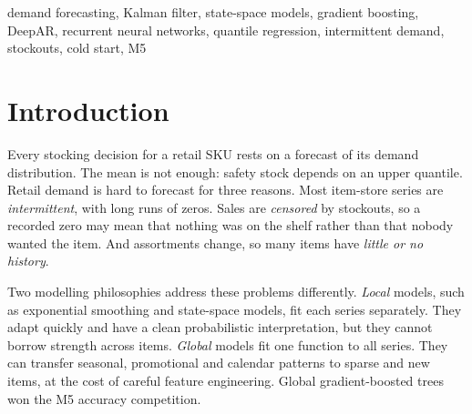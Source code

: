 \documentclass[conference]{IEEEtran}
\begin{document}
\begin{abstract}
\end{abstract}

\begin{IEEEkeywords}
demand forecasting, Kalman filter, state-space models, gradient boosting, DeepAR, recurrent neural networks, quantile regression, intermittent demand, stockouts, cold start, M5
\end{IEEEkeywords}

\section{Introduction}
Every stocking decision for a retail SKU rests on a forecast of its demand distribution. The mean is not enough: safety stock depends on an upper quantile. Retail demand is hard to forecast for three reasons. Most item-store series are \emph{intermittent}, with long runs of zeros. Sales are \emph{censored} by stockouts, so a recorded zero may mean that nothing was on the shelf rather than that nobody wanted the item. And assortments change, so many items have \emph{little or no history}.

Two modelling philosophies address these problems differently. \emph{Local} models, such as exponential smoothing and state-space models, fit each series separately. They adapt quickly and have a clean probabilistic interpretation, but they cannot borrow strength across items. \emph{Global} models fit one function to all series. They can transfer seasonal, promotional and calendar patterns to sparse and new items, at the cost of careful feature engineering. Global gradient-boosted trees won the M5 accuracy competition.
\end{document}

